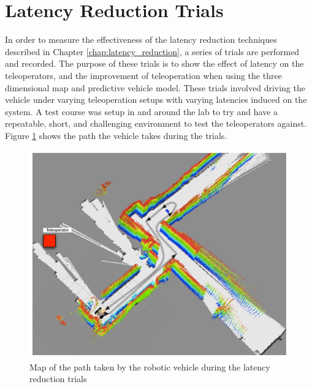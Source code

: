 \documentclass[12pt]{report}
\begin{document}
\section{Latency Reduction Trials}\label{sec:latency_reduction_trials}
In order to measure the effectiveness of the latency reduction techniques described in Chapter \ref{chap:latency_reduction}, a series of trials are performed and recorded.  The purpose of these trials is to show the effect of latency on the teleoperators, and the improvement of teleoperation when using the three dimensional map and predictive vehicle model.  These trials involved driving the vehicle under varying teleoperation setups with varying latencies induced on the system.  A test course was setup in and around the lab to try and have a repeatable, short, and challenging environment to test the teleoperators against.  Figure \ref{fig:latency_reduction_map} shows the path the vehicle takes during the trials.

\begin{figure}[ht]
  \centering
  \includegraphics[width=6.5in,keepaspectratio]{latency_reduction_map.pdf}
  \caption{Map of the path taken by the robotic vehicle during the latency reduction trials}
  \label{fig:latency_reduction_map}
\end{figure}
\end{document}
